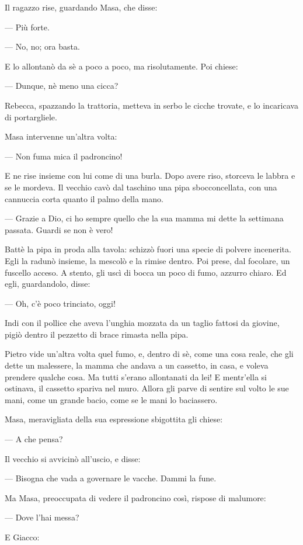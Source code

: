 Il ragazzo rise, guardando Masa, che disse:

— Più forte.

— No, no; ora basta.

E lo allontanò da sè a poco a poco, ma risolutamente. Poi chiese:

— Dunque, nè meno una cicca?

Rebecca, spazzando la trattoria, metteva in serbo le cicche trovate, e lo incaricava di portargliele.

Masa intervenne un’altra volta:

— Non fuma mica il padroncino!

E ne rise insieme con lui come di una burla. Dopo avere riso, storceva le labbra e se le mordeva. Il vecchio cavò dal taschino una pipa sbocconcellata, con una cannuccia corta quanto il palmo della mano.

— Grazie a Dio, ci ho sempre quello che la sua mamma mi dette la settimana passata. Guardi se non è vero!

Battè la pipa in proda alla tavola: schizzò fuori una specie di polvere incenerita. Egli la radunò insieme, la mescolò e la rimise dentro. Poi prese, dal focolare, un fuscello acceso. A stento, gli uscì di bocca un poco di fumo, azzurro chiaro. Ed egli, guardandolo, disse:

— Oh, c’è poco trinciato, oggi!

Indi con il pollice che aveva l’unghia mozzata da un taglio fattosi da giovine, pigiò dentro il pezzetto di brace rimasta nella pipa.

Pietro vide un’altra volta quel fumo, e, dentro di sè, come una cosa reale, che gli dette un malessere, la mamma che andava a un cassetto, in casa, e voleva prendere qualche cosa. Ma tutti s’erano allontanati da lei! E mentr’ella si ostinava, il cassetto spariva nel muro. Allora gli parve di sentire sul volto le sue mani, come un grande bacio, come se le mani lo baciassero.

Masa, meravigliata della sua espressione sbigottita gli chiese:

— A che pensa?

Il vecchio si avvicinò all’uscio, e disse:

— Bisogna che vada a governare le vacche. Dammi la fune.

Ma Masa, preoccupata di vedere il padroncino così, rispose di malumore:

— Dove l’hai messa?

E Giacco:

